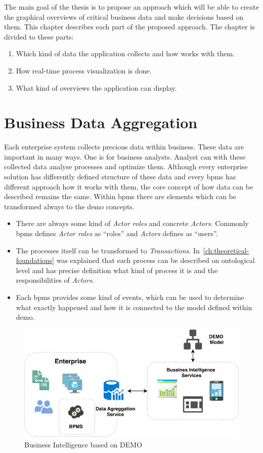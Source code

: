 The main goal of the thesis is to propose an approach which will be able to create the graphical overviews of critical business data and make decisions based on them. This chapter describes each part of the proposed approach. The chapter is divided to these parts:	
    \begin{enumerate}
      \item Which kind of data the application collects and how works with them.
      \item How real-time process visualization is done.
      \item What kind of overviews the application can display. 
    \end{enumerate}
\section{Business Data Aggregation}
Each enterprise system collects precious data within business. These data are important in many ways. One is for business analysts. Analyst can with these collected data analyse processes and optimize them. Although every enterprise solution has differently defined structure of these data and every \gls{bpms} has different approach how it works with them, the core concept of how data can be described remains the same. 
Within \gls{bpms} there are elements which can be transformed always to the \gls{demo} concepts.
\begin{itemize}
\item There are always some kind of \textit{Actor roles} and concrete \textit{Actors}. Commonly \gls{bpms} defines \textit{Actor roles} as ``roles'' and \textit{Actors} defines as ``users''.
\item The processes itself can be transformed to \textit{Transactions}. In~\cref{ch:theoretical-foundations} was explained that each process can be described on ontological level and has precise definition what kind of process it is and the responsibilities of \textit{Actors}.
\item Each \gls{bpms} provides some kind of events, which can be used to determine what exactly happened and how it is connected to the model defined within \gls{demo}.
\end{itemize}

\begin{figure}[ht!]
  \centering
  \includegraphics[width=12cm,keepaspectratio]{img/bi-demo-overview}
  \caption{Business Intelligence based on DEMO}
  \label{fig:bi-demo-overview}
\end{figure}    

